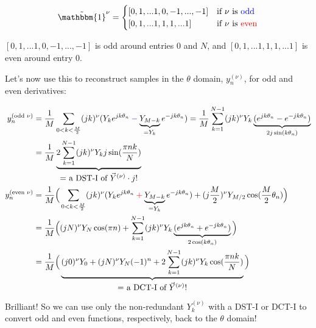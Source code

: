 \documentclass[10pt]{article}
\begin{document}
$$\tilde{\mathbbm{1}}^\nu = \begin{cases} [0, 1, ... 1, 0, -1, ..., -1] & \text{if $\nu$ is \color{blue}odd}\\ [0, 1, ... 1, 1, 1, ... 1] & \text{if $\nu$ is \color{red}even}\end{cases}$$

$[0, 1, ... 1, 0, -1, ..., -1]$ is odd around entries $0$ and $N$, and $[0, 1, ... 1, 1, 1, ... 1]$ is even around entry $0$.\newline

Let's now use this to reconstruct samples in the $\theta$ domain, $y_n^{(\nu)}$, for odd and even derivatives:\vspace{-5mm}

\begin{align}
y_n^{(\text{odd } \nu)} &= \frac{1}{M} \sum_{0 < k < \frac{M}{2}} (jk)^\nu (Y_k e^{jk\theta_n} \color{blue}-\color{black} \underbrace{Y_{M-k}}_{= Y_k} e^{-jk\theta_n}) = \frac{1}{M} \sum_{k=1}^{N-1} (jk)^\nu Y_k \underbrace{(e^{jk\theta_n} - e^{-jk\theta_n})}_{2j\sin(k\theta_n)} \notag \\
&= \frac{1}{M} \underbrace{2 \sum_{k=1}^{N-1} (jk)^\nu Y_k j \sin(\frac{\pi nk}{N})}_{\text{\normalsize = a DST-I of $\vec{Y}^{(\nu)} \cdot j$!}} \label{y_prime_odd}\\
y_n^{(\text{even } \nu)} &= \frac{1}{M} \Big( \sum_{0 < k < \frac{M}{2}} (jk)^\nu (Y_k e^{jk\theta_n} \color{red}+\color{black} \underbrace{Y_{M-k}}_{= Y_k} e^{-jk\theta_n}) + (j\frac{M}{2})^\nu Y_{M/2} \cos(\frac{M}{2}\theta_n) \Big) \notag \\
&= \frac{1}{M} \Big( (jN)^\nu Y_N \cos(\pi n) + \sum_{k=1}^{N-1} (jk)^\nu Y_k \underbrace{(e^{jk\theta_n} + e^{-jk\theta_n})}_{2\cos(k\theta_n)} \Big) \notag \\
&= \frac{1}{M} \Big( \underbrace{(j0)^\nu Y_0 + (jN)^\nu Y_N (-1)^n + 2 \sum_{k=1}^{N-1} (jk)^\nu Y_k \cos(\frac{\pi nk}{N})}_{\text{\normalsize = a DCT-I of $\vec{Y}^{(\nu)}$!}} \Big) \label{y_prime_even}
\end{align}

Brilliant! So we can use only the non-redundant $Y_k^{(\nu)}$ with a DST-I or DCT-I to convert odd and even functions, respectively, back to the $\theta$ domain!
\end{document}
